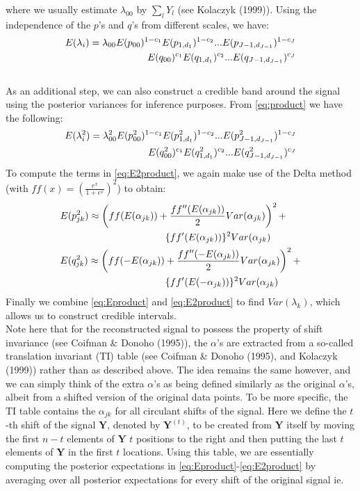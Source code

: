 \documentclass[12pt]{article}
\newcommand{\Ga}{\alpha}
\newcommand{\Gl}{\lambda}    \newcommand{\GL}{\Lambda}
\begin{document}
\begin{appendices}
where we usually estimate $\Gl_{00}$ by $\sum_l Y_l$ (see Kolaczyk (1999)). Using the independence of the $p$'s and $q$'s from different scales, we have:
\begin{eqnarray}\label{eq:Eproduct}E(\Gl_i)=\Gl_{00}E(p_{00})^{1-c_1}E(p_{1,d_1})^{1-c_2}...E(p_{J-1,d_{J-1}})^{1-c_J}\notag\\
E(q_{00})^{c_1}E(q_{1,d_1})^{c_2}...E(q_{J-1,d_{J-1}})^{c_J}\end{eqnarray}
\bigskip\\
As an additional step, we can also construct a credible band around the signal using the posterior variances for inference purposes. From \eqref{eq:product} we have the following:
\begin{eqnarray}\label{eq:E2product}E(\Gl_i^2)=\Gl_{00}^2E(p_{00}^2)^{1-c_1}E(p_{1,d_1}^2)^{1-c_2}...E(p_{J-1,d_{J-1}}^2)^{1-c_J}\notag\\
E(q_{00}^2)^{c_1}E(q_{1,d_1}^2)^{c_2}...E(q_{J-1,d_{J-1}}^2)^{c_J}\end{eqnarray}
To compute the terms in \eqref{eq:E2product}, we again make use of the Delta method (with $ff(x)=(\frac{e^x}{1+e^x})^2$) to obtain:
\begin{eqnarray}
&E(p_{jk}^2)\approx \left(ff(E(\Ga_{jk}))+\frac{ff''(E(\Ga_{jk}))}{2}Var(\Ga_{jk})\right)^2+\notag\\
& \hspace{1.5 in}\{ff'(E(\Ga_{jk}))\}^2Var(\Ga_{jk})\\
&E(q_{jk}^2)\approx \left(ff(-E(\Ga_{jk}))+\frac{ff''(-E(\Ga_{jk}))}{2}Var(\Ga_{jk})\right)^2+\notag\\
& \hspace{1.5 in}\{ff'(E(-\Ga_{jk}))\}^2Var(\Ga_{jk})
\end{eqnarray}
Finally we combine \eqref{eq:Eproduct} and \eqref{eq:E2product} to find $Var(\Gl_k)$, which allows us to construct credible intervals.\bigskip\\
Note here that for the reconstructed signal to possess the property of shift invariance (see Coifman \& Donoho (1995)), the $\Ga$'s are extracted from a so-called translation invariant (TI) table (see Coifman \& Donoho (1995), and Kolaczyk (1999)) rather than as described above. The idea remains the same however, and we can simply think of the extra $\Ga$'s as being defined similarly as the original $\Ga$'s, albeit from a shifted version of the original data points. To be more specific, the TI table contains the $\Ga_{jk}$ for all circulant shifts of the signal. Here we define the $t$-th shift of the signal $\bm{Y}$, denoted by $\bm{Y}^{(t)}$, to be created from $\bm{Y}$ itself by moving the first $n-t$ elements of $\bm{Y}$ $t$ positions to the right and then putting the last $t$ elements of $\bm{Y}$ in the first $t$ locations. Using this table, we are essentially computing the posterior expectations in \eqref{eq:Eproduct}-\eqref{eq:E2product} by averaging over all posterior expectations for every shift of the original signal ie.

\end{appendices}
\end{document}
